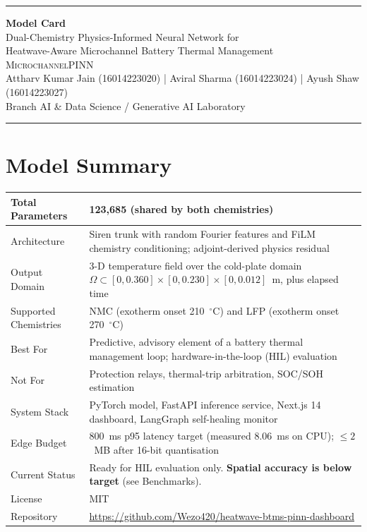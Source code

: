 \documentclass[10.5pt,a4paper]{article}
\begin{document}
\noindent\rule{\linewidth}{1.5pt}
\begin{center}
  {\fontsize{24}{28}\selectfont\bfseries Model Card}\\[6pt]
  {\large Dual-Chemistry Physics-Informed Neural Network for\\
  Heatwave-Aware Microchannel Battery Thermal Management}\\[8pt]
  {\small\textsc{MicrochannelPINN}}\\[4pt]
  {\small
  Attharv Kumar Jain (16014223020) \quad|\quad
  Aviral Sharma (16014223024) \quad|\quad
  Ayush Shaw (16014223027)\\[2pt]
  Branch AI \& Data Science / Generative AI Laboratory}
\end{center}
\vspace{-0.3em}\noindent\rule{\linewidth}{1.5pt}
\vspace{0.8em}

\section*{Model Summary}
\begin{tabularx}{\linewidth}{@{}KV@{}}
\toprule
Total Parameters & 123,685 (shared by both chemistries) \\
\midrule
Architecture & Siren trunk with random Fourier features and FiLM chemistry conditioning; adjoint-derived physics residual \\
\midrule
Output Domain & 3-D temperature field over the cold-plate domain $\Omega\subset[0,0.360]\times[0,0.230]\times[0,0.012]$~m, plus elapsed time \\
\midrule
Supported Chemistries & NMC (exotherm onset 210~$^\circ$C) and LFP (exotherm onset 270~$^\circ$C) \\
\midrule
Best For & Predictive, advisory element of a battery thermal management loop; hardware-in-the-loop (HIL) evaluation \\
\midrule
Not For & Protection relays, thermal-trip arbitration, SOC/SOH estimation \\
\midrule
System Stack & PyTorch model, FastAPI inference service, Next.js 14 dashboard, LangGraph self-healing monitor \\
\midrule
Edge Budget & 800~ms p95 latency target (measured 8.06~ms on CPU); $\le 2$~MB after 16-bit quantisation \\
\midrule
Current Status & Ready for HIL evaluation only. \textcolor{bad}{\textbf{Spatial accuracy is below target}} (see Benchmarks). \\
\midrule
License & MIT \\
\midrule
Repository & \url{https://github.com/Wezo420/heatwave-btms-pinn-dashboard} \\
\bottomrule
\end{tabularx}
\end{document}
